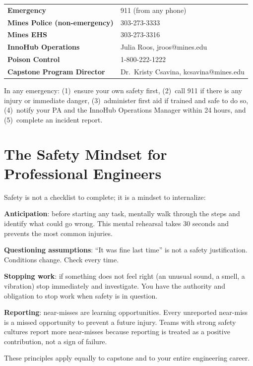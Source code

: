 \begin{center}\small
\begin{tabularx}{\textwidth}{lX}
\toprule
\textbf{Emergency} & 911 (from any phone) \\
\textbf{Mines Police (non-emergency)} & 303-273-3333 \\
\textbf{Mines EHS} & 303-273-3316 \\
\textbf{InnoHub Operations} & Julia Roos, jroos@mines.edu \\
\textbf{Poison Control} & 1-800-222-1222 \\
\textbf{Capstone Program Director} & Dr.\ Kristy Csavina, kcsavina@mines.edu \\
\bottomrule
\end{tabularx}
\end{center}

In any emergency: (1)~ensure your own safety first, (2)~call 911 if there is any injury or immediate danger, (3)~administer first aid if trained and safe to do so, (4)~notify your PA and the InnoHub Operations Manager within 24 hours, and (5)~complete an incident report.



\section{The Safety Mindset for Professional Engineers}
Safety is not a checklist to complete; it is a mindset to internalize:

\textbf{Anticipation}: before starting any task, mentally walk through the steps and identify what could go wrong. This mental rehearsal takes 30 seconds and prevents the most common injuries.

\textbf{Questioning assumptions}: ``It was fine last time'' is not a safety justification. Conditions change. Check every time.

\textbf{Stopping work}: if something does not feel right (an unusual sound, a smell, a vibration) stop immediately and investigate. You have the authority and obligation to stop work when safety is in question.

\textbf{Reporting}: near-misses are learning opportunities. Every unreported near-miss is a missed opportunity to prevent a future injury. Teams with strong safety cultures report more near-misses because reporting is treated as a positive contribution, not a sign of failure.

These principles apply equally to capstone and to your entire engineering career.


